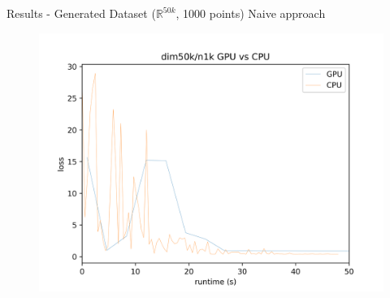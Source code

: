 \documentclass{beamer}
\def \R {\mathbb{R}}
\def \R {\mathbb{R}}
\begin{document}
\begin{frame}{Results - Generated Dataset ($\R^{50k}$, 1000 points)}
  Naive approach\\
  \begin{figure}
    \includegraphics[scale=0.5]{50k_lim}
\end{figure}
\end{frame}


	

\end{document}
